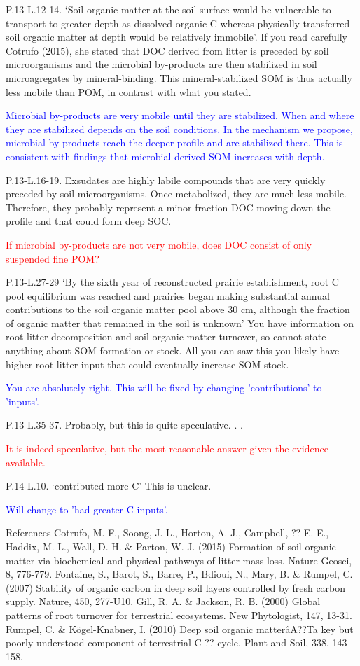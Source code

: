 \documentclass[]{article}
\begin{document}
P.13-L.12-14. `Soil organic matter at the soil surface would be
vulnerable to transport to greater depth as dissolved organic C whereas
physically-transferred soil organic matter at depth would be relatively
immobile'. If you read carefully Cotrufo (2015), she stated that DOC
derived from litter is preceded by soil microorganisms and the microbial
by-products are then stabilized in soil microagregates by
mineral-binding. This mineral-stabilized SOM is thus actually less
mobile than POM, in contrast with what you stated.

\textcolor{blue}{Microbial by-products are very mobile until they are stabilized. When and where they are stabilized depends on the soil conditions. In the mechanism we propose, microbial by-products reach the deeper profile and are stabilized there. This is consistent with findings that microbial-derived SOM increases with depth.}

P.13-L.16-19. Exsudates are highly labile compounds that are very
quickly preceded by soil microorganisms. Once metabolized, they are much
less mobile. Therefore, they probably represent a minor fraction DOC
moving down the profile and that could form deep SOC.

\textcolor{red}{If microbial by-products are not very mobile, does DOC consist of only suspended fine POM?}

P.13-L.27-29 `By the sixth year of reconstructed prairie establishment,
root C pool equilibrium was reached and prairies began making
substantial annual contributions to the soil organic matter pool above
30 cm, although the fraction of organic matter that remained in the soil
is unknown' You have information on root litter decomposition and soil
organic matter turnover, so cannot state anything about SOM formation or
stock. All you can saw this you likely have higher root litter input
that could eventually increase SOM stock.

\textcolor{blue}{You are absolutely right. This will be fixed by changing 'contributions' to 'inputs'.}

P.13-L.35-37. Probably, but this is quite speculative. . .

\textcolor{red}{It is indeed speculative, but the most reasonable answer given the evidence available.}

P.14-L.10. `contributed more C' This is unclear.

\textcolor{blue}{Will change to 'had greater C inputs'.}

References Cotrufo, M. F., Soong, J. L., Horton, A. J., Campbell, ?? E.
E., Haddix, M. L., Wall, D. H. \& Parton, W. J. (2015) Formation of soil
organic matter via biochemical and physical pathways of litter mass
loss. Nature Geosci, 8, 776-779. Fontaine, S., Barot, S., Barre, P.,
Bdioui, N., Mary, B. \& Rumpel, C. (2007) Stability of organic carbon in
deep soil layers controlled by fresh carbon supply. Nature, 450,
277-U10. Gill, R. A. \& Jackson, R. B. (2000) Global patterns of root
turnover for terrestrial ecosystems. New Phytologist, 147, 13-31.
Rumpel, C. \& Kögel-Knabner, I. (2010) Deep soil organic matterâA??Ta
key but poorly understood component of terrestrial C ?? cycle. Plant and
Soil, 338, 143-158.
\end{document}
